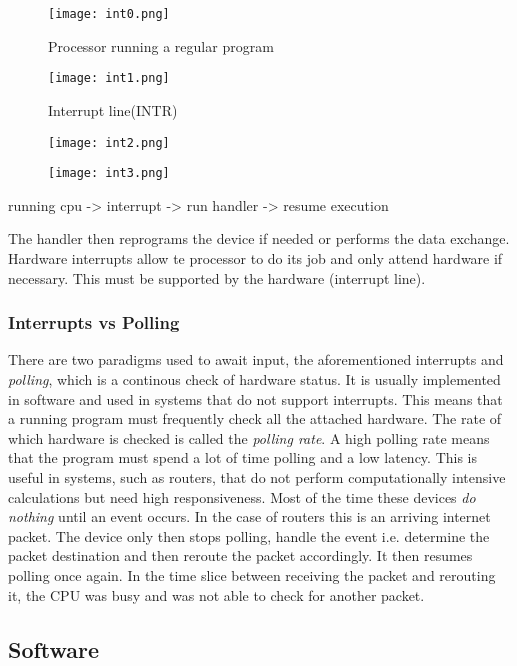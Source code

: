 \begin{figure}
\texttt{[image: int0.png]}
\caption{Processor running a regular program}
\end{figure}

\begin{figure}
\texttt{[image: int1.png]}
\caption{Interrupt line(INTR)}
\end{figure}

\begin{figure}
\texttt{[image: int2.png]}
\caption{}
\end{figure}

\begin{figure}
\texttt{[image: int3.png]}
\caption{}
\end{figure}
running cpu -> interrupt -> run handler -> resume execution


The handler then reprograms the device if needed or performs the data exchange. Hardware 
interrupts allow te processor to do its job and only attend hardware if necessary. This
must be supported by the hardware (interrupt line).

\subsubsection{Interrupts vs Polling}

There are two paradigms used to await input, the aforementioned interrupts and \textit{polling}, 
which is a continous check of hardware status. It is usually implemented in software and 
used in systems that do not support interrupts. This means that a running program must 
frequently check all the attached hardware. The rate of which hardware is checked is called 
the \textit{polling rate}. A high polling rate means that the program must spend a lot of time 
polling and a low latency. This is useful in systems, such as routers, that do not perform 
computationally intensive calculations but need high responsiveness. Most of the time these 
devices \textit{do nothing} until an event occurs. In the case of routers this is an arriving 
internet packet. The device only then stops polling, handle the event i.e. determine 
the packet destination and then reroute the packet accordingly. It then resumes polling once 
again. In the time slice between receiving the packet and rerouting it, the CPU was busy and
was not able to check for another packet. 

\subsection{Software}

